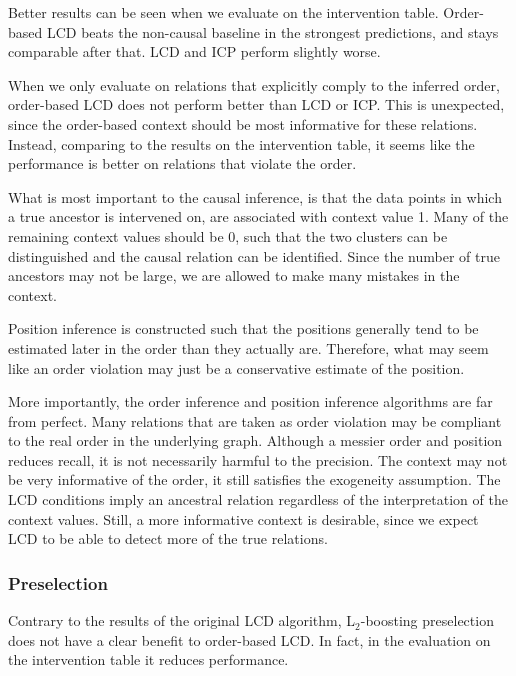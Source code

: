 Better results can be seen when we evaluate on the intervention table. Order-based LCD beats the non-causal baseline in the strongest predictions, and stays comparable after that. LCD and ICP perform slightly worse. 

When we only evaluate on relations that explicitly comply to the inferred order, order-based LCD does not perform better than LCD or ICP. This is unexpected, since the order-based context should be most informative for these relations. Instead, comparing to the results on the intervention table, it seems like the performance is better on relations that violate the order.

What is most important to the causal inference, is that the data points in which a true ancestor is intervened on, are associated with context value 1. Many of the remaining context values should be 0, such that the two clusters can be distinguished and the causal relation can be identified. Since the number of true ancestors may not be large, we are allowed to make many mistakes in the context.

Position inference is constructed such that the positions generally tend to be estimated later in the order than they actually are. Therefore, what may seem like an order violation may just be a conservative estimate of the position.

More importantly, the order inference and position inference algorithms are far from perfect. Many relations that are taken as order violation may be compliant to the real order in the underlying graph. Although a messier order and position reduces recall, it is not necessarily harmful to the precision. The context may not be very informative of the order, it still satisfies the exogeneity assumption. The LCD conditions imply an ancestral relation regardless of the interpretation of the context values. Still, a more informative context is desirable, since we expect LCD to be able to detect more of the true relations.


\subsubsection{Preselection}
Contrary to the results of the original LCD algorithm, L$_2$-boosting preselection does not have a clear benefit to order-based LCD. In fact, in the evaluation on the intervention table it reduces performance. 

